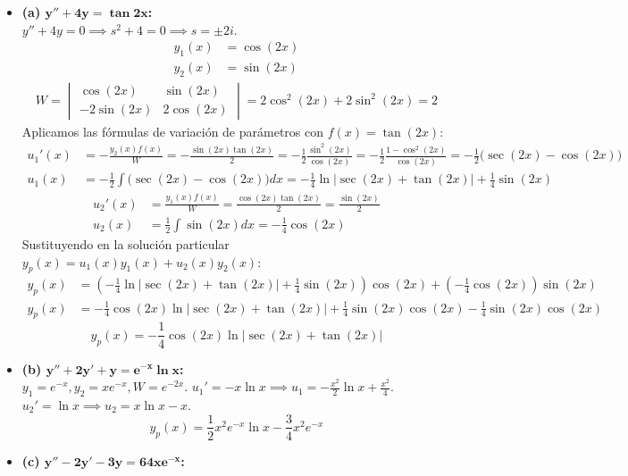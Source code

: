 \documentclass[11pt, a4paper]{article}
\begin{document}
\begin{itemize}
\item \textbf{(a) $\bm{y''+4y=\tan 2x}$:} \\
$y''+4y=0 \implies s^2+4=0 \implies s=\pm 2i$. 
\begin{align*}
y_1(x) &= \cos(2x) \\
y_2(x) &= \sin(2x)
\end{align*}
\begin{align*}
W = \begin{vmatrix} \cos(2x) & \sin(2x) \\ -2\sin(2x) & 2\cos(2x) \end{vmatrix} = 2\cos^2(2x) + 2\sin^2(2x) = 2
\end{align*}
Aplicamos las fórmulas de variación de parámetros con $f(x) = \tan(2x)$:
\begin{align*}
u_1'(x) &= -\frac{y_2(x)f(x)}{W} = -\frac{\sin(2x)\tan(2x)}{2} = -\frac{1}{2}\frac{\sin^2(2x)}{\cos(2x)} = -\frac{1}{2}\frac{1-\cos^2(2x)}{\cos(2x)} = -\frac{1}{2}\big(\sec(2x) - \cos(2x)\big) \\
u_1(x) &= -\frac{1}{2}\int \big(\sec(2x) - \cos(2x)\big)dx = -\frac{1}{4}\ln|\sec(2x) + \tan(2x)| + \frac{1}{4}\sin(2x)
\end{align*}
\begin{align*}
u_2'(x) &= \frac{y_1(x)f(x)}{W} = \frac{\cos(2x)\tan(2x)}{2} = \frac{\sin(2x)}{2} \\
u_2(x) &= \frac{1}{2}\int \sin(2x)dx = -\frac{1}{4}\cos(2x)
\end{align*}
Sustituyendo en la solución particular $y_p(x) = u_1(x)y_1(x) + u_2(x)y_2(x)$:
\begin{align*}
y_p(x) &= \left( -\frac{1}{4}\ln|\sec(2x) + \tan(2x)| + \frac{1}{4}\sin(2x) \right)\cos(2x) + \left( -\frac{1}{4}\cos(2x) \right)\sin(2x) \\
y_p(x) &= -\frac{1}{4}\cos(2x)\ln|\sec(2x) + \tan(2x)| + \frac{1}{4}\sin(2x)\cos(2x) - \frac{1}{4}\sin(2x)\cos(2x)
\end{align*}
\[
\boxed{y_p(x) = -\frac{1}{4}\cos(2x)\ln|\sec(2x) + \tan(2x)|}
\]
\item \textbf{(b) $\bm{y''+2y'+y=e^{-x}\ln x}$:} \\
$y_1 = e^{-x}, y_2 = x e^{-x}, W = e^{-2x}$. $u_1' = -x\ln x \implies u_1 = -\frac{x^2}{2}\ln x + \frac{x^2}{4}$. $u_2' = \ln x \implies u_2 = x\ln x - x$.
\[
\boxed{y_p(x) = \frac{1}{2}x^2 e^{-x}\ln x - \frac{3}{4}x^2 e^{-x}}
\]
\item \textbf{(c) $\bm{y''-2y'-3y=64xe^{-x}}$:} \\

\end{itemize}
\end{document}
